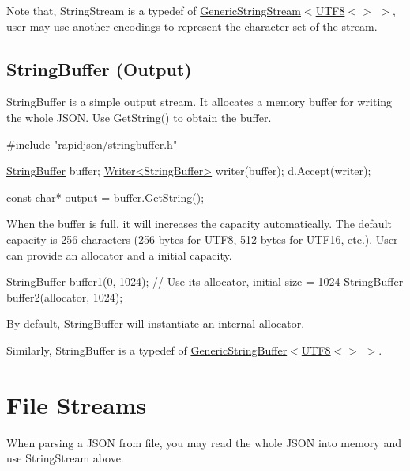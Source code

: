 Note that, {\ttfamily String\+Stream} is a typedef of {\ttfamily \hyperlink{struct_generic_string_stream}{Generic\+String\+Stream}$<$\hyperlink{struct_u_t_f8}{U\+T\+F8}$<$$>$ $>$}, user may use another encodings to represent the character set of the stream.\hypertarget{md_Cadriciel_Commun_Externe_RapidJSON_doc_stream.zh-cn_StringBuffer}{}\subsection{String\+Buffer (\+Output)}\label{md_Cadriciel_Commun_Externe_RapidJSON_doc_stream.zh-cn_StringBuffer}
{\ttfamily String\+Buffer} is a simple output stream. It allocates a memory buffer for writing the whole J\+S\+ON. Use {\ttfamily Get\+String()} to obtain the buffer.


\begin{DoxyCode}
\textcolor{preprocessor}{#include "rapidjson/stringbuffer.h"}

\hyperlink{class_generic_string_buffer}{StringBuffer} buffer;
\hyperlink{class_writer}{Writer<StringBuffer>} writer(buffer);
d.Accept(writer);

\textcolor{keyword}{const} \textcolor{keywordtype}{char}* output = buffer.GetString();
\end{DoxyCode}


When the buffer is full, it will increases the capacity automatically. The default capacity is 256 characters (256 bytes for \hyperlink{struct_u_t_f8}{U\+T\+F8}, 512 bytes for \hyperlink{struct_u_t_f16}{U\+T\+F16}, etc.). User can provide an allocator and a initial capacity.


\begin{DoxyCode}
\hyperlink{class_generic_string_buffer}{StringBuffer} buffer1(0, 1024); \textcolor{comment}{// Use its allocator, initial size = 1024}
\hyperlink{class_generic_string_buffer}{StringBuffer} buffer2(allocator, 1024);
\end{DoxyCode}


By default, {\ttfamily String\+Buffer} will instantiate an internal allocator.

Similarly, {\ttfamily String\+Buffer} is a typedef of {\ttfamily \hyperlink{class_generic_string_buffer}{Generic\+String\+Buffer}$<$\hyperlink{struct_u_t_f8}{U\+T\+F8}$<$$>$ $>$}.\hypertarget{md_Cadriciel_Commun_Externe_RapidJSON_doc_stream.zh-cn_FileStreams}{}\section{File Streams}\label{md_Cadriciel_Commun_Externe_RapidJSON_doc_stream.zh-cn_FileStreams}
When parsing a J\+S\+ON from file, you may read the whole J\+S\+ON into memory and use {\ttfamily String\+Stream} above.

